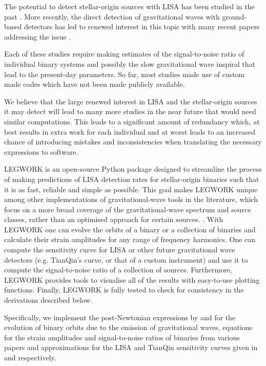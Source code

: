 \documentclass[twocolumn]{aastex631}
\newcommand{\lw}{LEGWORK}
\begin{document}
The potential to detect stellar-origin sources with LISA has been studied in the past \citep[e.g.][]{Nelemans+2001, Liu+2009, Liu+2014, Ruiter+2010, Belczynski+2010, Yu+2010, Nissanke+2012}. More recently, the direct detection of gravitational waves with ground-based detectors has led to renewed interest in this topic with many recent papers addressing the issue \citep[e.g.][]{Korol+2017, Korol+2018, Korol+2019, Korol+2020, Christian+2017, Kremer+2017, Kremer+2018, Lamberts+2018, Lamberts+2019, Fang+2019, Andrews+2020, Lau+2020, Breivik+2020, Breivik+2020a, Roebber+2020, Chen+2020, Sesana+2020, Shao+2021}.

Each of these studies require making estimates of the signal-to-noise ratio of individual binary systems and possibly the slow gravitational wave inspiral that lead to the present-day parameters. So far, most studies made use of custom made codes which have not been made publicly available. 

We believe that the large renewed interest in LISA and the stellar-origin sources it may detect will lead to many more studies in the near future that would need similar computations. This leads to a significant amount of redundancy which, at best results in extra work for each individual and at worst leads to an increased chance of introducing mistakes and inconsistencies when translating the necessary expressions to software.

\lw{} is an open-source Python package designed to streamline the process of making predictions of LISA detection rates for stellar-origin binaries such that it is as fast, reliable and simple as possible. This goal makes \lw{} unique among other implementations of gravitational-wave tools in the literature, which focus on a more broad coverage of the gravitational-wave spectrum and source classes, rather than an optimised approach for certain sources. \citep[e.g.][]{Moore+2015,Yi2021}. With \lw{} one can evolve the orbits of a binary or a collection of binaries and calculate their strain amplitudes for any range of frequency harmonics. One can compute the sensitivity curve for LISA or other future gravitational wave detectors (e.g. TianQin's curve, or that of a custom instrument) and use it to compute the signal-to-noise ratio of a collection of sources. Furthermore, \lw{} provides tools to visualise all of the results with easy-to-use plotting functions. Finally, \lw{} is fully tested to check for consistency in the derivations described below.

Specifically, we implement the post-Newtonian expressions by \citet{Peters+1963} and \citet{Peters+1964} for the evolution of binary orbits due to the emission of gravitational waves, equations for the strain amplitudes and signal-to-noise ratios of binaries from various papers \citep[e.g.][]{Flanagan+1998, Finn+2000, Cornish2003, Barack+2004, Moore+2015} and approximations for the LISA and TianQin sensitivity curves given in \citet{Robson+2019} and \citet{Huang+2020} respectively.
\end{document}

